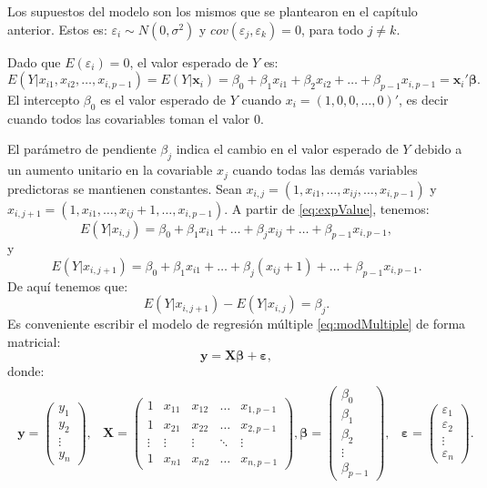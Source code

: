 \documentclass[
]{article}
\begin{document}
Los supuestos del modelo son los mismos que se plantearon en el capítulo anterior. Estos es: \(\varepsilon_{i} \sim N\left(0,\sigma^{2} \right)\) y \(cov(\varepsilon_{j},\varepsilon_{k})=0\), para todo \(j \neq k\).

Dado que \(E(\varepsilon_{i})=0\), el valor esperado de \(Y\) es:
\begin{equation}
E(Y| x_{i1},x_{i2},\ldots,x_{i,p-1}) = E(Y| \boldsymbol x_{i}) = \beta_{0} + \beta_{1}x_{i1} + \beta_{2}x_{i2} + \ldots + \beta_{p-1} x_{i,p-1} = \boldsymbol x_{i}'\boldsymbol \beta.
\label{eq:expValue}
\end{equation}
El intercepto \(\beta_{0}\) es el valor esperado de \(Y\) cuando \(x_{i}=(1,0,0,\ldots,0)'\), es decir cuando todos las covariables toman el valor \(0\).

El parámetro de pendiente \(\beta_{j}\) indica el cambio en el valor esperado de \(Y\) debido a un aumento unitario en la covariable \(x_{j}\) cuando todas las demás variables predictoras se mantienen constantes. Sean \(x_{i,j} = (1,x_{i1},\ldots,x_{ij},\ldots,x_{i,p-1})\) y \(x_{i,j+1} = (1,x_{i1},\ldots,x_{ij}+1,\ldots,x_{i,p-1})\). A partir de \eqref{eq:expValue}, tenemos:
\[
E(Y|x_{i,j}) = \beta_{0} + \beta_{1}x_{i1} + \ldots + \beta_{j}x_{ij} + \ldots + \beta_{p-1} x_{i,p-1},
\]
y
\[
E(Y|x_{i,j+1}) = \beta_{0} + \beta_{1}x_{i1} + \ldots + \beta_{j}(x_{ij}+1) + \ldots + \beta_{p-1} x_{i,p-1}.
\]
De aquí tenemos que:
\[
E(Y|x_{i,j+1}) - E(Y|x_{i,j}) = \beta_{j}.
\]
Es conveniente escribir el modelo de regresión múltiple \eqref{eq:modMultiple} de forma matricial:
\[
\boldsymbol y= \boldsymbol X\boldsymbol \beta+ \boldsymbol \varepsilon,
\]
donde:
\begin{gather}
\begin{aligned}
\boldsymbol y= \begin{pmatrix}
y_{1} \\ y_{2} \\ \vdots \\ y_{n}
\end{pmatrix}, & \boldsymbol X= \begin{pmatrix}
1 & x_{11} & x_{12} & \ldots & x_{1,p-1} \\ 1 & x_{21} & x_{22} & \ldots & x_{2,p-1} \\ \vdots & \vdots & \vdots & \ddots & \vdots \\ 1 & x_{n1} & x_{n2} & \ldots & x_{n,p-1}
\end{pmatrix},
\boldsymbol \beta= \begin{pmatrix}
\beta_{0} \\ \beta_{1} \\ \beta_{2} \\ \vdots \\ \beta_{p-1}
\end{pmatrix}, & \boldsymbol \varepsilon= \begin{pmatrix}
\varepsilon_{1} \\ \varepsilon_{2} \\ \vdots \\ \varepsilon_{n}
\end{pmatrix}.
\end{aligned}
\nonumber
\end{gather}
\end{document}
